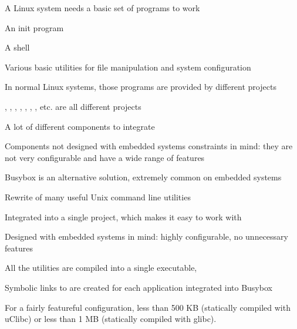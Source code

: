 
  \startitemize
  \item A Linux system needs a basic set of programs to work
    \startitemize
    \item An init program
    \item A shell
    \item Various basic utilities for file manipulation and system
      configuration
    \stopitemize
  \item In normal Linux systems, those programs are provided by
    different projects
    \startitemize
    \item {}, , , ,
      , , , etc. are all different
      projects
    \item A lot of different components to integrate
    \item Components not designed with embedded systems constraints in
      mind: they are not very configurable and have a wide range of
      features
    \stopitemize
  \item Busybox is an alternative solution, extremely common on
    embedded systems
  \stopitemize

  \startitemize
  \item Rewrite of many useful Unix command line utilities
    \startitemize
    \item Integrated into a single project, which makes it easy to
      work with
    \item Designed with embedded systems in mind: highly configurable,
      no unnecessary features
    \stopitemize
  \item All the utilities are compiled into a single executable,
    \startitemize
    \item Symbolic links to  are created for each
      application integrated into Busybox
    \stopitemize
  \item For a fairly featureful configuration, less than 500 KB
    (statically compiled with uClibc) or less than 1 MB (statically
    compiled with glibc).
  \item   {}
  \stopitemize

